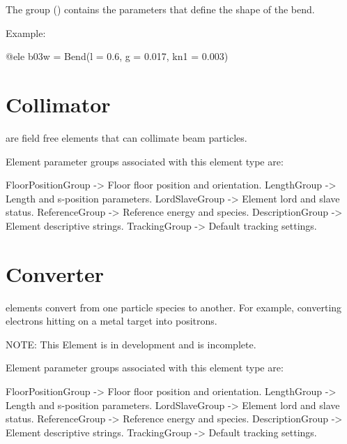 The  group () contains the parameters that define the shape of the bend.

Example:
\begin{example}
  @ele b03w = Bend(l = 0.6, g = 0.017, kn1 = 0.003)
\end{example}

\newpage

\section{Collimator}
\label{s:collimator}

 are field free elements that can collimate beam particles.

Element parameter groups associated with this element type are:
\TOPrule
\begin{example}
  FloorPositionGroup -> Floor floor position and orientation.  
  LengthGroup        -> Length and s-position parameters.  
  LordSlaveGroup     -> Element lord and slave status.  
  ReferenceGroup     -> Reference energy and species.  
  DescriptionGroup   -> Element descriptive strings.  
  TrackingGroup      -> Default tracking settings.  
\end{example}
\BOTTOMrule

\section{Converter}
\label{s:converter}

 elements convert from one particle species to another. 
For example, converting electrons hitting on a metal target into positrons.

NOTE: This Element is in development and is incomplete.

Element parameter groups associated with this element type are:
\TOPrule
\begin{example}
  FloorPositionGroup -> Floor floor position and orientation.  
  LengthGroup        -> Length and s-position parameters.  
  LordSlaveGroup     -> Element lord and slave status.  
  ReferenceGroup     -> Reference energy and species.  
  DescriptionGroup   -> Element descriptive strings.  
  TrackingGroup      -> Default tracking settings.  
\end{example}
\BOTTOMrule

